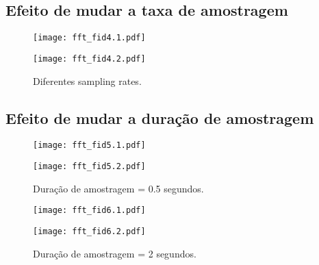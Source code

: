 \subsection{Efeito de mudar a taxa de amostragem}



\begin{figure}[!ht]
    \centering
    \begin{minipage}[b]{0.49\textwidth}
        \centering
        \texttt{[image: fft\_fid4.1.pdf]}
    \end{minipage}
    \hfill
    \begin{minipage}[b]{0.49\textwidth}
        \centering
        \texttt{[image: fft\_fid4.2.pdf]}
    \end{minipage}
    \caption{Diferentes sampling rates.}
\end{figure}

\subsection{Efeito de mudar a duração de amostragem}



\begin{figure}[!ht]
    \centering
    \begin{minipage}[b]{0.49\textwidth}
        \centering
        \texttt{[image: fft\_fid5.1.pdf]}
    \end{minipage}
    \hfill
    \begin{minipage}[b]{0.49\textwidth}
        \centering
        \texttt{[image: fft\_fid5.2.pdf]}
    \end{minipage}
    \caption{Duração de amostragem = 0.5 segundos.}
\end{figure}

\begin{figure}[!ht]
    \centering
    \begin{minipage}[b]{0.49\textwidth}
        \centering
        \texttt{[image: fft\_fid6.1.pdf]}
    \end{minipage}
    \hfill
    \begin{minipage}[b]{0.49\textwidth}
        \centering
        \texttt{[image: fft\_fid6.2.pdf]}
    \end{minipage}
    \caption{Duração de amostragem = 2 segundos.}
\end{figure}

